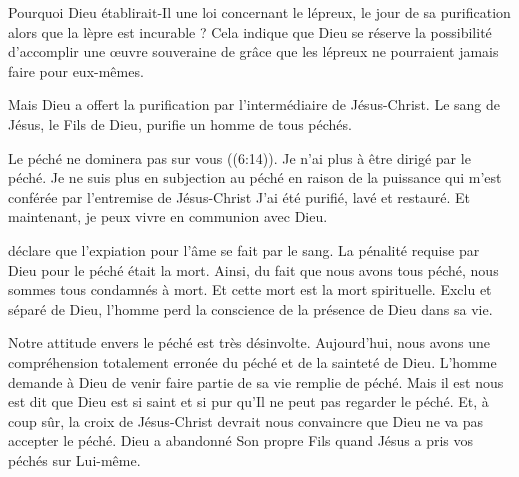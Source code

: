 Pourquoi Dieu établirait-Il une loi concernant le lépreux,
 le jour de sa purification alors que la lèpre est incurable ?
 Cela indique que Dieu se réserve la possibilité d'accomplir
 une œuvre souveraine de grâce que les lépreux ne pourraient
 jamais faire pour eux-mêmes. 


Mais Dieu a offert la purification par l'intermédiaire de Jésus-Christ.
 Le sang de Jésus, le Fils de Dieu, purifie un homme de tous péchés. 

\og Le péché ne dominera pas sur vous \fg{} ((6:14)).
 Je n'ai plus à être dirigé par le péché.
 Je ne suis plus en subjection au péché en raison de la puissance
 qui m'est conférée par l'entremise de Jésus-Christ
 \ocadr{}J'ai été purifié, lavé et restauré.
 Et maintenant, je peux vivre en communion avec Dieu. 

\dvrule






 déclare que l'expiation
 pour l'âme se fait par le sang.
 La pénalité requise par Dieu pour le péché était la mort.
 Ainsi, du fait que nous avons tous péché,
 nous sommes tous condamnés à mort.
 Et cette mort est la mort spirituelle. Exclu et séparé de Dieu,
 l'homme perd la conscience de la présence de Dieu dans sa vie. 

Notre attitude envers le péché est très désinvolte.
 Aujourd'hui, nous avons une compréhension totalement erronée du péché
 et de la sainteté de Dieu.
 L'homme demande à Dieu de venir faire partie de sa vie remplie de péché.
 Mais il est nous est dit que Dieu est si saint et si pur
 qu'Il ne peut pas regarder le péché.
 Et, à coup sûr, la croix de Jésus-Christ devrait nous convaincre
 que Dieu ne va pas accepter le péché.
 Dieu a abandonné Son propre Fils quand Jésus a pris vos péchés
 sur Lui-même.

